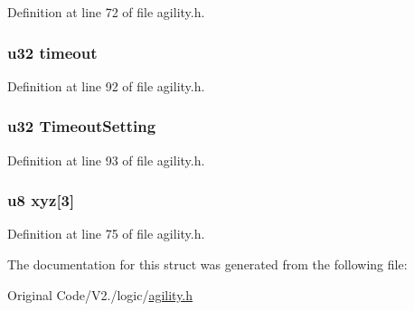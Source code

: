 \-Definition at line 72 of file agility.\-h.

\hypertarget{structagil_aab0b8a4320e771becf663b000c2cd7e1}{
\subsubsection[{timeout}]{\setlength{\rightskip}{0pt plus 5cm}u32 {\bf timeout}}}\label{structagil_aab0b8a4320e771becf663b000c2cd7e1}


\-Definition at line 92 of file agility.\-h.

\hypertarget{structagil_a20960b675c12b40c0761d99bd95661c8}{
\subsubsection[{\-Timeout\-Setting}]{\setlength{\rightskip}{0pt plus 5cm}u32 {\bf \-Timeout\-Setting}}}\label{structagil_a20960b675c12b40c0761d99bd95661c8}


\-Definition at line 93 of file agility.\-h.

\hypertarget{structagil_af9cba48daaf1e24eb2df884547c0efcc}{
\subsubsection[{xyz}]{\setlength{\rightskip}{0pt plus 5cm}u8 {\bf xyz}\mbox{[}3\mbox{]}}}\label{structagil_af9cba48daaf1e24eb2df884547c0efcc}


\-Definition at line 75 of file agility.\-h.



\-The documentation for this struct was generated from the following file\-:\begin{DoxyCompactItemize}
\item 
\-Original Code/\-V2./logic/\hyperlink{agility_8h}{agility.\-h}\end{DoxyCompactItemize}
